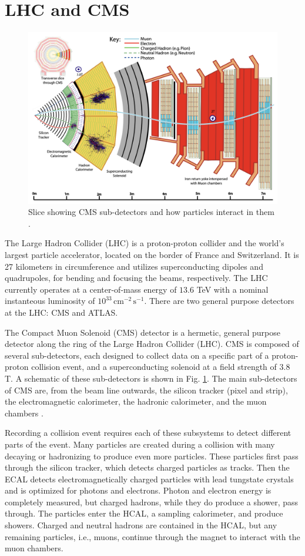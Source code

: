 \documentclass[12pt]{article}
\begin{document}
\section{LHC and CMS}
\begin{figure}
   \centering
   \includegraphics[width=0.55\linewidth]{figures/CMSslice_whiteBackground.png}
   \caption{Slice showing CMS sub-detectors and how particles interact in them \cite{particle_flow_2017}.}
   \label{fig:cms-subdetectors}
\end{figure}

The Large Hadron Collider (LHC) is a proton-proton collider and the world's largest particle accelerator, located on the border of France and Switzerland. It is 27 kilometers in circumference and utilizes superconducting dipoles and quadrupoles, for bending and focusing the beams, respectively. The LHC currently operates at a center-of-mass energy of $13.6$ TeV with a nominal instanteous luminosity of $10^{33}\, \text{cm}^{-2}\, \text{s}^{-1}$. There are two general purpose detectors at the LHC: CMS and ATLAS.\par

The Compact Muon Solenoid (CMS) detector is a hermetic, general purpose detector along the ring of the Large Hadron Collider (LHC). CMS is composed of several sub-detectors, each designed to collect data on a specific part of a proton-proton collision event, and a superconducting solenoid at a field strength of $3.8$ T. A schematic of these sub-detectors is shown in Fig. \ref{fig:cms-subdetectors}. The main sub-detectors of CMS are, from the beam line outwards, the silicon tracker (pixel and strip), the electromagnetic calorimeter, the hadronic calorimeter, and the muon chambers \cite{CMS_Collaboration_2008}.\par

Recording a collision event requires each of these subsystems to detect different parts of the event. Many particles are created during a collision with many decaying or hadronizing to produce even more particles. These particles first pass through the silicon tracker, which detects charged particles as tracks. Then the ECAL detects electromagnetically charged particles with lead tungstate crystals and is optimized for photons and electrons. Photon and electron energy is completely measured, but charged hadrons, while they do produce a shower, pass through. The particles enter the HCAL, a sampling calorimeter, and produce showers. Charged and neutral hadrons are contained in the HCAL, but any remaining particles, i.e., muons, continue through the magnet to interact with the muon chambers.\par
\end{document}
